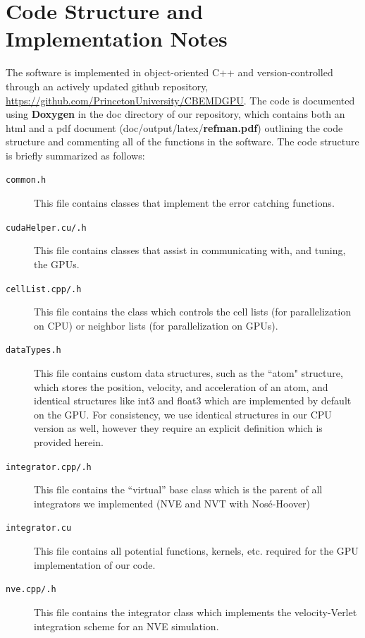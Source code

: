 \documentclass[12pt]{article}
\begin{document}
\section{Code Structure and Implementation Notes}

The software is implemented in object-oriented C++ and version-controlled through an actively updated github repository, \url{https://github.com/PrincetonUniversity/CBEMDGPU}. The code is documented using \textbf{Doxygen} in the doc directory of our repository, which contains both an html and a pdf document (doc/output/latex/\textbf{refman.pdf}) outlining the code structure and commenting all of the functions in the software.
%
The code structure is briefly summarized as follows:
\begin{description}

\item[\texttt{common.h}] This file contains classes that implement the error catching functions.

\item[\texttt{cudaHelper.cu/.h}] This file contains classes that assist in communicating with, and tuning, the GPUs.

\item[\texttt{cellList.cpp/.h}] This file contains the class which controls the cell lists (for parallelization on CPU) or neighbor lists (for parallelization on GPUs).

\item[\texttt{dataTypes.h}] This file contains custom data structures, such as the ``atom" structure, which stores the position, velocity, and acceleration of an atom, and identical structures like int3 and float3 which are implemented by default on the GPU.  For consistency, we use identical structures in our CPU version as well, however they require an explicit definition which is provided herein.
	
\item[\texttt{integrator.cpp/.h}] This file contains the ``virtual'' base class which is the parent of all integrators we implemented (NVE and NVT with Nos\'{e}-Hoover)

\item[\texttt{integrator.cu}] This file contains all potential functions, kernels, etc. required for the GPU implementation of our code.

\item[\texttt{nve.cpp/.h}] This file contains the integrator class which implements the velocity-Verlet integration scheme for an NVE simulation.


\end{description}
\end{document}
